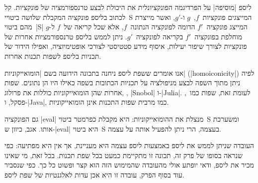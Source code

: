 ליספ \ע|מוסיפה| על הפרדיגמה הפונקציונלית את היכולת לבצע טרנספורמציה של
פונקציות. קל לכתוב בליספ פונקציה המקבלת שלושה ביטויי~S המייצגים
פונקציות~$f$,~$g$ ו-$g'$, ואשר מייצרת מהם ביטוי~\E|S| המייצג פונקציה~$f'$ הדומה
לפונקציה הנתונה~$f$, אלא שכל קריאה של~$f$ ל-$g$ מוחלפת בפונקציה~$f'$ בקריאה
לפונקציה~$g'$. ניתן לממש בליספ טרנספורמציות אחרות של פונקציות לצורך שיפור
יעילות, איסוף מידע סטטיסטי לצורכי אופטימיזציה, ואפילו הידור של תכניות בליספ
לשפות תכנות אחרות.

אנו אומרים ששפת ליספ ניחנה בתכונה הידועה בשם \ע|הומואייקוניות|
(\E|homoiconicity|) לפיה ניתן מתוך השפה לבצע מניפולציה על תכניות הכתובות בשפה
כאילו היו הן נתונים. שפות אחרות שהן הומואייקוניות כוללות את פרולוג, , \E|Snobol| ו-\E|Julia|. לעומת זאת, שפות כמו~\CPL, פסקל,
ו-\E|Java|, כמו מרבית שפות התכנות אינן הומואייקוניות.

גם הפונקציה \E|eval| מנצלת את ההומואייקוניות: היא מקבלת כפרמטר ביטוי~S ומשערכת
אותו. אגב, כיוון ש-\E|eval| היא ביטוי~S בעצמה, הרי ניתן להפעיל אותה על עצמה.

העובדה שניתן לממש את ליספ באמצעות ליספ עצמה היא מעניינת, אך אין היא מפתיעה: כפי
שנראה בסופו של פרק זה, תכונה זו מתקיימת כמעט בכל שפת תכנות. בכל זאת, מי שאינו
מכיר את ליספ, ודאי יופתע אולי מהעובדה שהמימוש הזה הוא קצר ופשוט כל כך. כפי
שנסביר עוד בסוף הפרק, עובדה זו היא אכן עדות לאלגנטיות של שפת ליספ.


